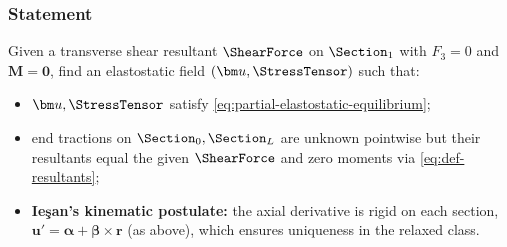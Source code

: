 \subsubsection*{Statement}
Given a transverse shear resultant \(\ShearForce\) on \(\Section_1\) with
\(F_3=0\) and \(\bm M=\mathbf{0}\), find an elastostatic field \((\bm u,\StressTensor)\) such that:
\begin{itemize}
\item \(\bm u,\StressTensor\) satisfy \eqref{eq:partial-elastostatic-equilibrium};
\item end tractions on \(\Section_0,\Section_L\) are unknown pointwise but their resultants equal the given \(\ShearForce\) and zero moments via \eqref{eq:def-resultants};
\item \textbf{Ie\c{s}an’s kinematic postulate:} the axial derivative is rigid on each section,
\(
\bm u'=\bm\alpha+\bm\beta\times\bm{r}
\)
(as above), which ensures uniqueness in the relaxed class.
\end{itemize}

